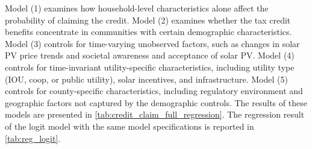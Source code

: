 \documentclass[11pt,twoside,letterpaper]{article}
\begin{document}
Model (1) examines how household-level characteristics alone affect the probability of claiming the credit. Model (2) examines whether the tax credit benefits concentrate in communities with certain demographic characteristics. Model (3) controls for time-varying unobserved factors, such as changes in solar PV price trends and societal awareness and acceptance of solar PV. Model (4) controls for time-invariant utility-specific characteristics, including utility type (IOU, coop, or public utility), solar incentives, and infrastructure. Model (5) controls for county-specific characteristics, including regulatory environment and geographic factors not captured by the demographic controls. The results of these models are presented in \autoref{tab:credit_claim_full_regression}. The regression result of the logit model with the same model specifications is reported in \autoref{tab:reg_logit}.
\end{document}
